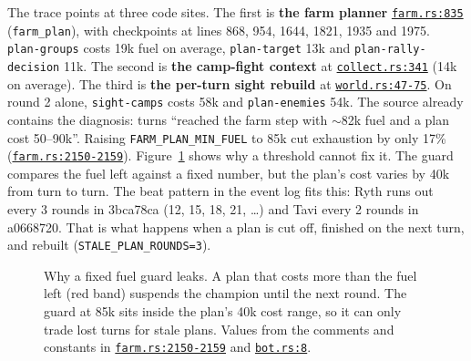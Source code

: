 \documentclass[11pt,a4paper]{article}
\newcommand{\repo}{file:///Users/tristanbasri/Desktop/Code/cambridge-battlecode-s2}
\newcommand{\src}[2]{{\small(\href{#1}{\textcolor{cTop}{\texttt{#2}}})}}
\newcommand{\code}[2]{\href{\repo/#1}{\texttt{\textcolor{cOurs!80!black}{#2}}}}
\newcommand{\vfive}{bots/bot-v5-r175199/src}
\begin{document}
The trace points at three code sites. The first is \textbf{the farm planner} \code{\vfive/common/farm.rs}{farm.rs:835} (\texttt{farm\_plan}), with checkpoints at lines 868, 954, 1644, 1821, 1935 and 1975. \texttt{plan-groups} costs 19k fuel on average, \texttt{plan-target} 13k and \texttt{plan-rally-decision} 11k. The second is \textbf{the camp-fight context} at \code{\vfive/common/collect.rs}{collect.rs:341} (14k on average). The third is \textbf{the per-turn sight rebuild} at \code{\vfive/common/world.rs}{world.rs:47-75}. On round 2 alone, \texttt{sight-camps} costs 58k and \texttt{plan-enemies} 54k. The source already contains the diagnosis: turns ``reached the farm step with $\sim$82k fuel and a plan cost 50--90k''. Raising \texttt{FARM\_PLAN\_MIN\_FUEL} to 85k cut exhaustion by only 17\% \src{\repo/\vfive/common/farm.rs}{farm.rs:2150-2159}. Figure~\ref{fig:budget} shows why a threshold cannot fix it. The guard compares the fuel left against a fixed number, but the plan's cost varies by 40k from turn to turn. The beat pattern in the event log fits this: Ryth runs out every 3 rounds in 3bca78ca (12, 15, 18, 21, \ldots) and Tavi every 2 rounds in a0668720. That is what happens when a plan is cut off, finished on the next turn, and rebuilt (\texttt{STALE\_PLAN\_ROUNDS=3}).

\begin{figure}[H]
\centering
{}
\caption{Why a fixed fuel guard leaks. A plan that costs more than the fuel left (red band) suspends the champion until the next round. The guard at 85k sits inside the plan's 40k cost range, so it can only trade lost turns for stale plans. Values from the comments and constants in \code{\vfive/common/farm.rs}{farm.rs:2150-2159} and \code{\vfive/bot.rs}{bot.rs:8}.}
\label{fig:budget}
\end{figure}
\end{document}
